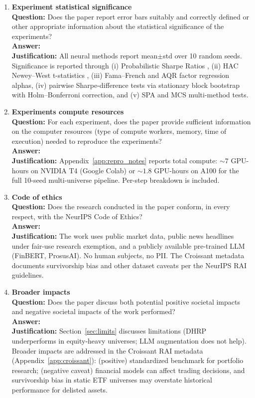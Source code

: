\begin{enumerate}
\item {\bf Experiment statistical significance}\\
\textbf{Question:} Does the paper report error bars suitably and correctly defined or other appropriate information about the statistical significance of the experiments?\\
\textbf{Answer:} \answerYes{}\\
\textbf{Justification:} All neural methods report mean$\pm$std over 10 random seeds. Significance is reported through (i) Probabilistic Sharpe Ratios \citep{Bailey2012PSR}, (ii) HAC Newey--West t-statistics \citep{NeweyWest1987}, (iii) Fama--French and AQR factor regression alphas, (iv) pairwise Sharpe-difference tests via stationary block bootstrap \citep{PolitisRomano1994} with Holm--Bonferroni correction, and (v) SPA \citep{Hansen2005} and MCS \citep{HansenLundeNason2011} multi-method tests.

\item {\bf Experiments compute resources}\\
\textbf{Question:} For each experiment, does the paper provide sufficient information on the computer resources (type of compute workers, memory, time of execution) needed to reproduce the experiments?\\
\textbf{Answer:} \answerYes{}\\
\textbf{Justification:} Appendix~\ref{app:repro_notes} reports total compute: $\sim 7$ GPU-hours on NVIDIA T4 (Google Colab) or $\sim 1.8$ GPU-hours on A100 for the full 10-seed multi-universe pipeline. Per-step breakdown is included.

\item {\bf Code of ethics}\\
\textbf{Question:} Does the research conducted in the paper conform, in every respect, with the NeurIPS Code of Ethics?\\
\textbf{Answer:} \answerYes{}\\
\textbf{Justification:} The work uses public market data, public news headlines under fair-use research exemption, and a publicly available pre-trained LLM (FinBERT, ProsusAI). No human subjects, no PII. The Croissant metadata documents survivorship bias and other dataset caveats per the NeurIPS RAI guidelines.

\item {\bf Broader impacts}\\
\textbf{Question:} Does the paper discuss both potential positive societal impacts and negative societal impacts of the work performed?\\
\textbf{Answer:} \answerYes{}\\
\textbf{Justification:} Section~\ref{sec:limits} discusses limitations (DHRP underperforms in equity-heavy universes; LLM augmentation does not help). Broader impacts are addressed in the Croissant RAI metadata (Appendix~\ref{app:croissant}): (positive) standardized benchmark for portfolio research; (negative caveat) financial models can affect trading decisions, and survivorship bias in static ETF universes may overstate historical performance for delisted assets.


\end{enumerate}
